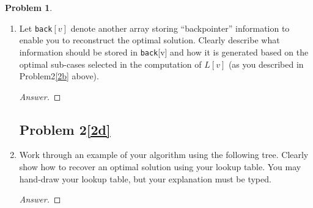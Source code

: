 \documentclass[11pt]{article}
\theoremstyle{definition}
\theoremstyle{definition}
\newtheorem{required}{Problem}
\theoremstyle{definition}
\begin{document}
\begin{required}
\begin{enumerate}[label=(\alph*)]
\begin{proof}[Answer]
\end{proof}

\newpage
\subsection{Problem 2\ref{2c}}
\item \label{2c} Let \texttt{back}$[v]$ denote another array storing ``backpointer'' information to enable you to reconstruct the optimal solution. Clearly describe what information should be stored in \texttt{back}[v] and how it is generated based on the optimal sub-cases selected in the computation of $L[v]$ (as you described in Problem2\ref{2b} above).


\begin{proof}[Answer]
\end{proof}

\newpage
\subsection{Problem 2\ref{2d}}
\item \label{2d} Work through an example of your algorithm using the following tree. Clearly show how to recover an optimal solution using your lookup table. You may hand-draw your lookup table, but your explanation must be typed.



\begin{proof}[Answer]
\end{proof}

\end{enumerate}



\end{required}
\end{document}
